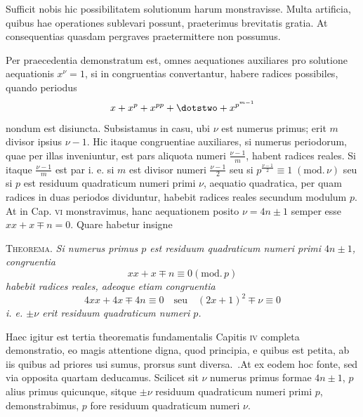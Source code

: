 Sufficit nobis hic possibilitatem solutionum harum monstravisse. Multa artificia, quibus hae operationes sublevari possunt, praeterimus brevitatis gratia. At consequentias quasdam pergraves praetermittere non possumus.

Per praecedentia demonstratum est, omnes aequationes auxiliares pro solutione aequationis $x^\nu=1$, si in congruentias convertantur, habere radices possibiles, quando periodus
\[
x+x^p+x^{pp}+\dotstwo+x^{p^{m-1}}
\]
nondum est disiuncta. Subsistamus in casu, ubi $\nu$ est numerus primus; erit $m$ divisor ipsius $\nu-1$. Hic itaque congruentiae auxiliares, si numerus periodorum, quae per illas inveniuntur, est pars aliquota numeri $\frac{\nu-1}m$, habent radices reales. Si itaque $\frac{\nu-1}m$ est par i. e. si $m$ est divisor numeri $\frac{\nu-1}2$ seu si $p^{\frac{\nu-1}2}\equiv1\;(\mathrm{mod.}\,\nu)$ seu si $p$ est residuum quadraticum numeri primi $\nu$, aequatio quadratica, per quam radices in duas periodos dividuntur, habebit radices reales secundum modulum $p$. At in Cap. \textsc{vi} monstravimus, hanc aequationem posito $\nu=4n\pm1$ semper esse $xx+x\mp n=0$. Quare habetur insigne

\textsc{Theorema.} \emph{Si numerus primus $p$ est residuum quadraticum numeri primi $4n\pm1$, congruentia}
\[
xx+x\mp n\equiv0(\mathrm{mod.}\,p)
\]
\emph{habebit radices reales, adeoque etiam congruentia}
\[
4xx+4x\mp4n\equiv0\quad\text{seu}\quad(2x+1)^2\mp\nu\equiv0
\]
\emph{i. e. $\pm\nu$ erit residuum quadraticum numeri $p$.}

Haec igitur est tertia theorematis fundamentalis Capitis \textsc{iv} completa demonstratio, eo magis attentione digna, quod principia, e quibus est petita, ab iis quibus ad priores usi sumus, prorsus sunt diversa.\ .At ex eodem hoc fonte, sed via opposita quartam deducamus. Scilicet sit $\nu$ numerus primus formae $4n\pm1$, $p$ alius primus quicunque, sitque $\pm\nu$ residuum quadraticum numeri primi $p$, demonstrabimus, $p$ fore residuum quadraticum numeri $\nu$.

